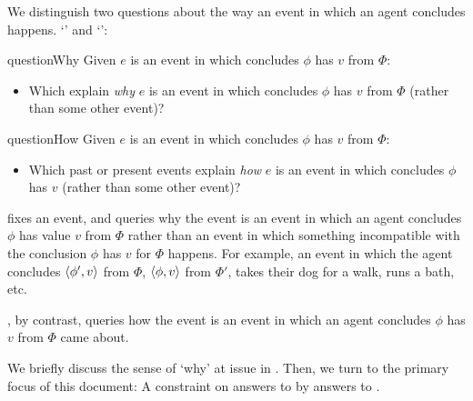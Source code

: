 \begin{note}
  We distinguish two questions about the way an event in which an agent concludes happens.
  `\qWhy{}' and `\qHow{}':

  \begin{question}{questionWhy}{\qWhy{}}
    Given \(e\) is an event in which \vAgent{} concludes \(\phi\) has  \(v\) from \(\Phi\):
    \begin{itemize}
    \item
      Which  explain \emph{why} \(e\) is an event in which \vAgent{} concludes \(\phi\) has  \(v\) from \(\Phi\) (rather than some other event)?
    \end{itemize}
    \vspace{-1.5\baselineskip}
  \end{question}

  \begin{question}{questionHow}{\qHow{}}
    \label{q:how}
    Given \(e\) is an event in which \vAgent{} concludes \(\phi\) has  \(v\) from \(\Phi\):
    \begin{itemize}
    \item
      Which past or present events explain \emph{how} \(e\) is an event in which \vAgent{} concludes \(\phi\) has  \(v\) (rather than some other event)?
    \end{itemize}
    \vspace{-1.5\baselineskip}
  \end{question}
\end{note}


\begin{note}
  \qWhy{} fixes an event, and queries why the event is an event in which an agent concludes \(\phi\) has value \(v\) from \(\Phi\) rather than an event in which something incompatible with the conclusion \(\phi\) has  \(v\) for \(\Phi\) happens.
  For example, an event in which the agent concludes \(\langle\phi', v\rangle\) from \(\Phi\), \(\langle\phi, v\rangle\) from \(\Phi'\), takes their dog for a walk, runs a bath, etc.

  \qHow{}, by contrast, queries how the event is an event in which an agent concludes \(\phi\) has  \(v\) from \(\Phi\) came about.
\end{note}

\begin{note}
  We briefly discuss the sense of `why' at issue in \qWhy{}.
  Then, we turn to the primary focus of this document:
  A constraint on answers to \qWhy{} by answers to \qHow{}.
\end{note}


